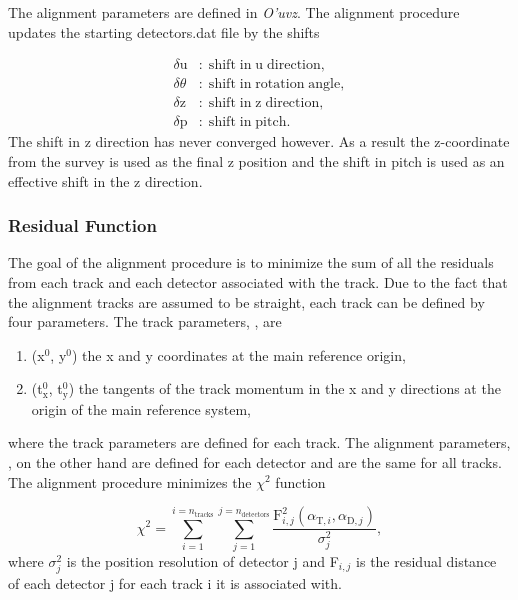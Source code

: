 The alignment parameters are defined in \textit{O'uvz}.  The alignment procedure
updates the starting detectors.dat file by the shifts

\begin{align}
  \delta \mathrm{u} & \mathrm{: \; shift \; in \; u \; direction,}  \\
  \delta \theta & \mathrm{: \; shift \; in \; rotation \; angle,}  \\
  \delta \mathrm{z} & \mathrm{: \; shift \; in \; z \; direction,}  \\
  \delta \mathrm{p} & \mathrm{: \; shift \; in \; pitch.} 
\end{align}
\noindent
The shift in z direction has never converged however.  As a result the
z-coordinate from the survey is used as the final z position and the shift in
pitch is used as an effective shift in the z direction.

\subsubsection{Residual Function}

The goal of the alignment procedure is to minimize the sum of all the residuals
from each track and each detector associated with the track.  Due to the fact
that the alignment tracks are assumed to be straight, each track can be defined
by four parameters.  The track parameters, {\atrack}, are

\begin{enumerate}[label=\roman*:]
\item (x$^0$, y$^0$) the x and y coordinates at the main reference origin,
\item (t$_{\mathrm{x}}^0$, t$_{\mathrm{y}}^0$) the tangents of the track
  momentum in the x and y directions at the origin of the main reference system,
\end{enumerate}
\noindent
where the track parameters are defined for each track.  The alignment
parameters, {\adet}, on the other hand are defined for each detector and are the
same for all tracks.  The alignment procedure minimizes the $\chi^2$ function

\begin{equation}
  \chi^2 =
  \sum_{i=1}^{i=n_{\mathrm{tracks}}}\sum_{j=1}^{j=n_{\mathrm{detectors}}}
  \frac{\mathrm{F}^2_{i,j}(\alpha_{\mathrm{T}, i}, \alpha_{\mathrm{D},
      j})}{\sigma_j^2},
  \label{equ::chi_align}%
\end{equation}
\noindent
where $\sigma^2_j$ is the position resolution of detector j and F$_{i,j}$ is the
residual distance of each detector j for each track i it is associated with.


